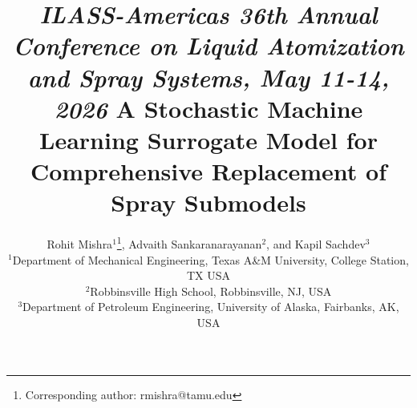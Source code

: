 \documentclass[letterpaper,twocolumn,10pt]{article}
\begin{document}
\ifpdf
{}
\else
{}
\fi

\title{\vspace{-0.25in} {\small \em ILASS-Americas 36th Annual Conference on Liquid
                   Atomization and Spray Systems,
                   May 11-14, 2026} \newline \newline
        \large {\bf A Stochastic Machine Learning Surrogate Model for Comprehensive Replacement of Spray Submodels} }
\author{\large Rohit Mishra$^{1}$\thanks{Corresponding author: rmishra@tamu.edu}, Advaith Sankaranarayanan$^{2}$, and Kapil Sachdev$^{3}$ \\
        \large $^{1}$Department of Mechanical Engineering, Texas A\&M University, College Station, TX USA \\
        \large $^{2}$Robbinsville High School, Robbinsville, NJ, USA \\
        \large $^{3}$Department of Petroleum Engineering, University of Alaska, Fairbanks, AK, USA \\
        \large }
\end{document}
